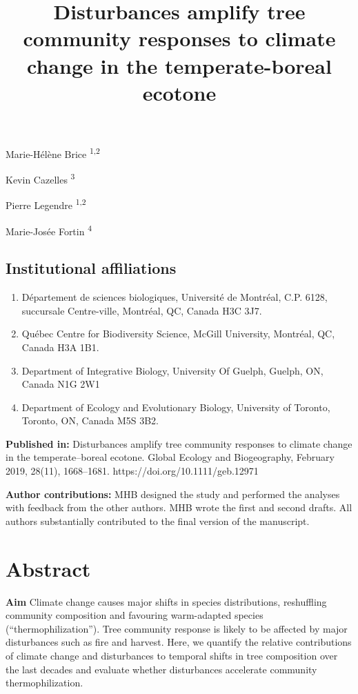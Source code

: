 \documentclass[
  a4paperpaper,
]{article}
\title{Disturbances amplify tree community responses to climate change in the
temperate-boreal ecotone}
\date{}
\providecommand{\tightlist}{%
  \setlength{\itemsep}{0pt}\setlength{\parskip}{0pt}}
\begin{document}
\maketitle

Marie-Hélène Brice \textsuperscript{1,2}

Kevin Cazelles \textsuperscript{3}

Pierre Legendre \textsuperscript{1,2}

Marie-Josée Fortin \textsuperscript{4}

\hypertarget{institutional-affiliations}{%
\subsection{Institutional
affiliations}\label{institutional-affiliations}}

\begin{enumerate}
\def\labelenumi{\arabic{enumi}.}
\tightlist
\item
  Département de sciences biologiques, Université de Montréal, C.P.
  6128, succursale Centre-ville, Montréal, QC, Canada H3C 3J7.
\item
  Québec Centre for Biodiversity Science, McGill University, Montréal,
  QC, Canada H3A 1B1.
\item
  Department of Integrative Biology, University Of Guelph, Guelph, ON,
  Canada N1G 2W1
\item
  Department of Ecology and Evolutionary Biology, University of Toronto,
  Toronto, ON, Canada M5S 3B2.
\end{enumerate}

\textbf{Published in:} Disturbances amplify tree community responses to
climate change in the temperate--boreal ecotone. Global Ecology and
Biogeography, February 2019, 28(11), 1668--1681.
https://doi.org/10.1111/geb.12971

\textbf{Author contributions:} MHB designed the study and performed the
analyses with feedback from the other authors. MHB wrote the first and
second drafts. All authors substantially contributed to the final
version of the manuscript.

\pagebreak

\hypertarget{abstract}{%
\section{Abstract}\label{abstract}}

\textbf{Aim} Climate change causes major shifts in species
distributions, reshuffling community composition and favouring
warm-adapted species (``thermophilization''). Tree community response is
likely to be affected by major disturbances such as fire and harvest.
Here, we quantify the relative contributions of climate change and
disturbances to temporal shifts in tree composition over the last
decades and evaluate whether disturbances accelerate community
thermophilization.
\end{document}
